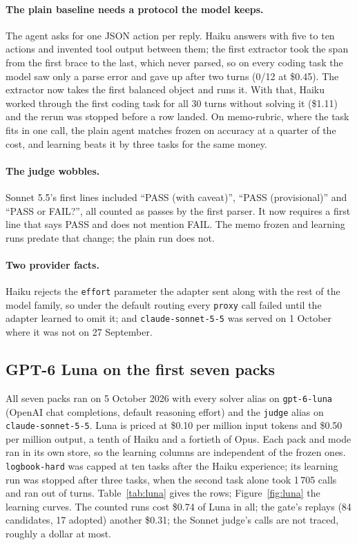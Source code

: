 \documentclass[11pt,a4paper]{article}
\newcommand{\code}[1]{\texttt{#1}}
\begin{document}
\paragraph{The plain baseline needs a protocol the model keeps.} The agent asks
for one JSON action per reply. Haiku answers with five to ten actions and
invented tool output between them; the first extractor took the span from the
first brace to the last, which never parsed, so on every coding task the model
saw only a parse error and gave up after two turns (0/12 at \$0.45). The
extractor now takes the first balanced object and runs it. With that, Haiku
worked through the first coding task for all 30 turns without solving it
(\$1.11) and the rerun was stopped before a row landed. On memo-rubric, where
the task fits in one call, the plain agent matches frozen on accuracy at a
quarter of the cost, and learning beats it by three tasks for the same money.

\paragraph{The judge wobbles.} Sonnet 5.5's first lines included ``PASS (with
caveat)'', ``PASS (provisional)'' and ``PASS or FAIL?'', all counted as passes
by the first parser. It now requires a first line that says PASS and does not
mention FAIL. The memo frozen and learning runs predate that change; the plain
run does not.

\paragraph{Two provider facts.} Haiku rejects the \code{effort} parameter the
adapter sent along with the rest of the model family, so under the default
routing every \code{proxy} call failed until the adapter learned to omit it;
and \code{claude-sonnet-5-5} was served on 1 October where it was not on 27
September.


\FloatBarrier
\subsection{GPT-6 Luna on the first seven packs}
\label{sec:luna}

All seven packs ran on 5 October 2026 with every solver alias on
\code{gpt-6-luna} (OpenAI chat completions, default reasoning effort) and the
\code{judge} alias on \code{claude-sonnet-5-5}. Luna is priced at \$0.10 per
million input tokens and \$0.50 per million output, a tenth of Haiku and a
fortieth of Opus. Each pack and mode ran in its own store, so the learning
columns are independent of the frozen ones. \code{logbook-hard} was capped at
ten tasks after the Haiku experience; its learning run was stopped after three
tasks, when the second task alone took 1\,705 calls and ran out of turns.
Table~\ref{tab:luna} gives the rows; Figure~\ref{fig:luna} the learning
curves. The counted runs cost \$0.74 of Luna in all; the gate's replays (84
candidates, 17 adopted) another \$0.31; the Sonnet judge's calls are not
traced, roughly a dollar at most.
\end{document}
